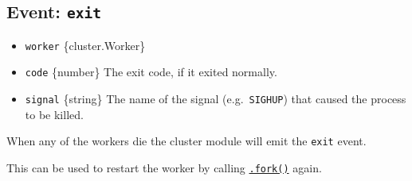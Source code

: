 \begin{Shaded}
\begin{Highlighting}[]
\NormalTok{(}\OperatorTok{,}\KeywordTok{=\textgreater{}}\NormalTok{ \{}
  \NormalTok{(}\SpecialCharTok{$\{}\SpecialCharTok{\}}\NormalTok{)}\OperatorTok{;}
\NormalTok{\})}\OperatorTok{;}
\end{Highlighting}
\end{Shaded}

\subsection{\texorpdfstring{Event:
\texttt{\textquotesingle{}exit\textquotesingle{}}}{Event: \textquotesingle exit\textquotesingle{}}}\label{event-exit-1}

\begin{itemize}
\tightlist
\item
  \texttt{worker} \{cluster.Worker\}
\item
  \texttt{code} \{number\} The exit code, if it exited normally.
\item
  \texttt{signal} \{string\} The name of the signal
  (e.g.~\texttt{\textquotesingle{}SIGHUP\textquotesingle{}}) that caused
  the process to be killed.
\end{itemize}

When any of the workers die the cluster module will emit the
\texttt{\textquotesingle{}exit\textquotesingle{}} event.

This can be used to restart the worker by calling
\hyperref[clusterforkenv]{\texttt{.fork()}} again.

\begin{Shaded}
\begin{Highlighting}[]
\NormalTok{(}\OperatorTok{,}\OperatorTok{,}\OperatorTok{,}\KeywordTok{=\textgreater{}}\NormalTok{ \{}
  \NormalTok{(}\OperatorTok{,}
\OperatorTok{,}\OperatorTok{||}\OperatorTok{;}
\NormalTok{()}\OperatorTok{;}
\NormalTok{\})}\OperatorTok{;}
\end{Highlighting}
\end{Shaded}

